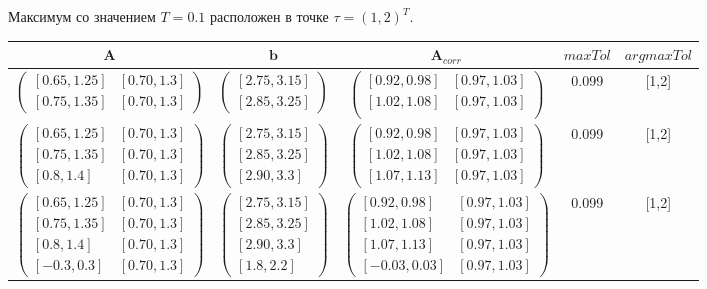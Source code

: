 \documentclass[10pt]{article}
\begin{document}
\begin{enumerate}
  Максимум со значением \( T = 0.1 \) расположен в точке
  \( \tau = (1, 2)^T \).
\begin{center}
\begin{tabular}{|c|c|c|c|c|}
\hline
$\mathbf{A}$&$\mathbf{b}$&$\mathbf{A}_{corr}$&$max{Tol}$& $argmax{Tol}$\\
\hline
$\begin{pmatrix}
    [0.65, 1.25] & [0.70, 1.3] \\
    [0.75, 1.35] & [0.70, 1.3]
\end{pmatrix}$&$\begin{pmatrix}
    [2.75, 3.15] \\
    [2.85, 3.25]
\end{pmatrix}$&
$\begin{pmatrix}
    [0.92, 0.98] & [0.97, 1.03]\\
    [1.02, 1.08] & [0.97, 1.03]\\
\end{pmatrix}$
&0.099&[1,2]\\
\hline
$\begin{pmatrix}
    [0.65, 1.25] & [0.70, 1.3] \\
    [0.75, 1.35] & [0.70, 1.3] \\
    [0.8, 1.4] & [0.70, 1.3]
\end{pmatrix}$
&$\begin{pmatrix}
    [2.75, 3.15] \\
    [2.85, 3.25]\\
    [2.90, 3.3]
\end{pmatrix}$&
$\begin{pmatrix}
    [0.92, 0.98]&[0.97, 1.03] \\
    [1.02, 1.08]&[0.97, 1.03] \\
    [1.07, 1.13]&[0.97, 1.03]
\end{pmatrix}$
&0.099&[1,2]\\
\hline
$\begin{pmatrix}
    [0.65, 1.25] & [0.70, 1.3] \\
    [0.75, 1.35] & [0.70, 1.3] \\
    [0.8, 1.4] & [0.70, 1.3] \\
    [-0.3, 0.3] & [0.70, 1.3]
\end{pmatrix}$&$\begin{pmatrix}
    [2.75, 3.15] \\
    [2.85, 3.25]\\
    [2.90, 3.3] \\
    [1.8,2.2]
\end{pmatrix}$&
$\begin{pmatrix}
    [0.92, 0.98]&[0.97, 1.03]\\
    [1.02, 1.08]&[0.97, 1.03]\\
    [1.07, 1.13]&[0.97, 1.03]\\
    [-0.03, 0.03]&[0.97, 1.03]
\end{pmatrix}$
&0.099&[1,2]\\
\hline
\end{tabular}
\end{center}


\end{enumerate}
\end{document}
